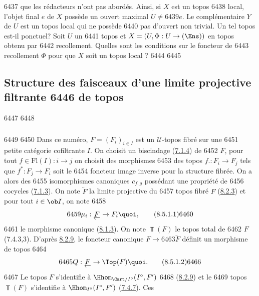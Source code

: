   6437	que les rédacteurs n'ont pas abordés. Ainsi, si $X$ est un topos
  6438	local, l'objet final $e$ de $X$ possède un ouvert maximal $U \neq
  6439	e$. Le complémentaire $Y$ de $U$ est un topos local qui ne possède
  6440	pas d'ouvert non trivial. Un tel topos est-il ponctuel? Soit $U$ un
  6441	topos et $X = (U, \Phi : U \to (\Ens))$ en topos obtenu par
  6442	recollement. Quelles sont les conditions sur le foncteur de
  6443	recollement $\Phi$ pour que $X$ soit un topos local ?
  6444	
  6445	\subsection{Structure des faisceaux d'une limite projective filtrante
  6446	  de topos}
  6447	
  6448	\subsubsection{}
  6449	
  6450	Dans ce numéro, $F = (F_i)_{i \in I}$ est un $𝒰$-topos fibré sur une
  6451	petite catégorie cofiltrante $I$. On choisit un biscindage (\hyperref[VI.subsubsec7.1.4]{7.1.4}) de
  6452	$F$, \ie pour tout $f \in \text{Fl}(I) : i \to j$ on choisit des morphismes
  6453	des topos $f. : F_i \to F_j$ tels que $f^{\ast} : F_j \to F_i$ soit le
  6454	foncteur image inverse pour la structure fibrée. On a alors des
  6455	isomorphismes canoniques $c_{f, g}$ possédant une propriété de
  6456	cocycles (\hyperref[VI.subsubsec7.1.3]{7.1.3}). On note $\underleftarrow{F}$ la limite projective du
  6457	topos fibré $F$ (\hyperref[VI.thm8.2.3]{8.2.3}) et pour tout $i \in \ob I$, on note
  6458	\begin{equation*}
  6459	\mu_i : \underleftarrow{F} \to F_i{\quoi},\tag{8.5.1.1}
  6460	\end{equation*}
  6461	le morphisme canonique (\hyperref[VI.subsubsec8.1.3]{8.1.3}). On note $\Top(F)$ le topos total de
  6462	$F$ (7.4.3,3). D'après \hyperref[VI.thm8.2.9]{8.2.9}, le foncteur canonique $F \to
  6463	\underrightarrow{F}$ définit un morphisme de topos
  6464	\begin{equation*}
  6465	Q : \underleftarrow{F} \to \Top(F){\quoi}.\tag{8.5.1.2}
  6466	\end{equation*}
  6467	Le topos $F$ s'identifie à $\Hhom_{\Cart /I^{\circ}} (I^{\circ}, F')$
  6468	(\hyperref[VI.thm8.2.9]{8.2.9}) et le
  6469	topos $\Top(F)$ s'identifie à $\Hhom_{I^{\circ}}(I^{\circ}, F')$ (\hyperref[VI.prop7.4.7]{7.4.7}). Ces
